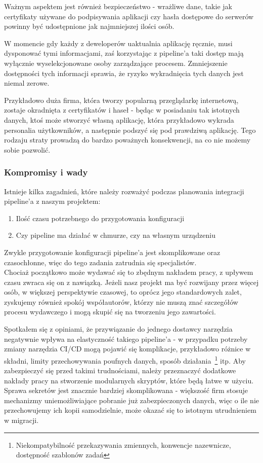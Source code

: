 Ważnym aspektem jest również bezpieczeństwo - wrażliwe dane, takie jak certyfikaty używane do podpisywania aplikacji czy
hasła dostępowe do serwerów powinny być udostępnione jak najmniejszej ilości osób.

W momencie gdy każdy z deweloperów uaktualnia aplikację ręcznie, musi dysponować tymi informacjami,
zaś korzystając z pipeline'a taki dostęp mają wyłącznie wyselekcjonowane osoby zarządzające procesem.
Zmniejszenie dostępności tych informacji sprawia, że ryzyko wykradnięcia tych danych jest niemal zerowe.

Przykładowo duża firma, która tworzy popularną przeglądarkę internetową, zostaje okradnięta z certyfikatów i haseł - 
będąc w posiadaniu tak istotnych danych, ktoś może stworzyć własną aplikację, która przykładowo wykrada personalia użytkowników, 
a następnie podszyć się pod prawdziwą aplikację. 
Tego rodzaju straty prowadzą do bardzo poważnych konsekwencji, na co nie możemy sobie pozwolić.

\subsubsection{Kompromisy i wady}
Istnieje kilka zagadnień, które należy rozważyć podczas planowania integracji pipeline'a z naszym projektem:
\begin{enumerate}
    \item Ilość czasu potrzebnego do przygotowania konfiguracji
    \item Czy pipeline ma działać w chmurze, czy na własnym urządzeniu
\end{enumerate}

Zwykle przygotowanie konfiguracji pipeline'a jest skomplikowane oraz \\%
czasochłonne, więc do tego zadania zatrudnia się specjalistów\todo{}. \\
Chociaż początkowo może wydawać się to zbędnym nakładem pracy, z upływem czasu zwraca się on z nawiązką.
Jeżeli nasz projekt ma być rozwijany przez więcej osób, w większej perspektywie czasowej, 
to oprócz jego standardowych zalet, zyskujemy również spokój współautorów, 
którzy nie muszą znać szczegółów procesu wydawczego i mogą skupić się na tworzeniu jego zawartości.

Spotkałem się z opiniami, że przywiązanie do jednego dostawcy narzędzia negatywnie wpływa na elastyczność 
takiego pipeline'a - w przypadku potrzeby zmiany narzędzia CI/CD mogą pojawić się komplikacje, 
przykładowo różnice w składni, limity przechowywania poufnych danych, sposób działania~\footnote[2]{
    Niekompatybilność przekazywania zmiennych, konwencje nazewnicze, dostępność szablonów zadań
} itp.
Aby zabezpieczyć się przed takimi trudnościami, należy przeznaczyć dodatkowe nakłady pracy na stworzenie 
modularnych skryptów, które będą łatwe w użyciu.
Sprawa sekretów jest znacznie bardziej skomplikowana - większość firm stosuje mechanizmy uniemożliwiające pobranie już 
zabezpieczonych danych, więc o ile nie przechowujemy ich kopii samodzielnie, może okazać się to istotnym utrudnieniem w migracji.

